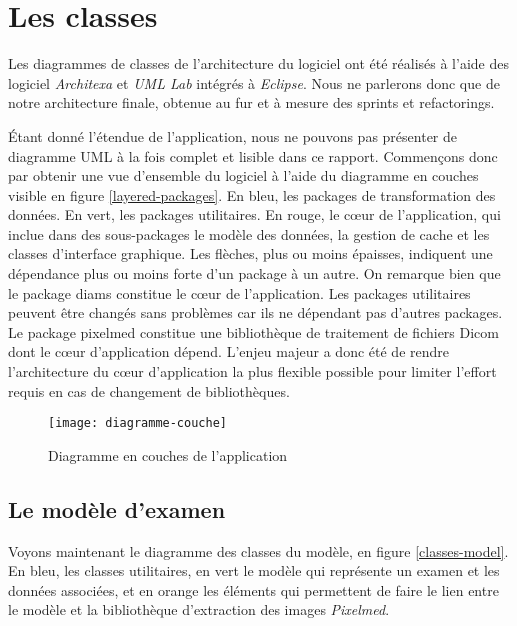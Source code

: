 \section{Les classes}

Les diagrammes de classes de l'architecture du logiciel ont été réalisés à l'aide des logiciel \emph{Architexa} et \emph{UML Lab} intégrés à \emph{Eclipse}. Nous ne parlerons donc que de notre architecture finale, obtenue au fur et à mesure des sprints et refactorings.

Étant donné l'étendue de l'application, nous ne pouvons pas présenter de diagramme UML à la fois complet et lisible dans ce rapport. Commençons donc par obtenir une vue d'ensemble du logiciel à l'aide du diagramme en couches visible en figure \vref{layered-packages}. En bleu, les packages de transformation des données. En vert, les packages utilitaires. En rouge, le cœur de l'application, qui inclue dans des sous-packages le modèle des données, la gestion de cache et les classes d'interface graphique. Les flèches, plus ou moins épaisses, indiquent une dépendance plus ou moins forte d'un package à un autre.
On remarque bien que le package diams constitue le cœur de l'application.
Les packages utilitaires peuvent être changés sans problèmes car ils ne dépendant pas d'autres packages.
Le package pixelmed constitue une bibliothèque de traitement de fichiers Dicom dont le cœur d'application dépend.
L'enjeu majeur a donc été de rendre l'architecture du cœur d'application la plus flexible possible pour limiter
l'effort requis en cas de changement de bibliothèques.


\begin{figure}[h]
\begin{center}
    \texttt{[image: diagramme-couche]}
\end{center}
    \caption{Diagramme en couches de l'application}
    \label{layered-packages}
\end{figure}

\subsection{Le modèle d'examen}

Voyons maintenant le diagramme des classes du modèle, en figure \vref{classes-model}.
En bleu, les classes utilitaires, en vert le modèle qui représente un examen et les données associées, et en
orange les éléments qui permettent de faire le lien entre le modèle et la bibliothèque d'extraction des images \emph{Pixelmed}.

